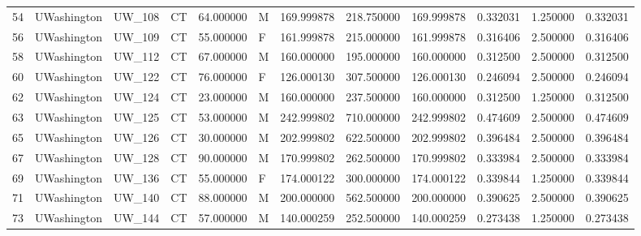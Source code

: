 \begin{tabular}{llllrlrrrrrr}
54     &     UWashington &       UW\_108 &                 CT &  64.000000 &        M &       169.999878 &    218.750000 &  169.999878 &               0.332031 &            1.250000 &          0.332031 \\
56     &     UWashington &       UW\_109 &                 CT &  55.000000 &        F &       161.999878 &    215.000000 &  161.999878 &               0.316406 &            2.500000 &          0.316406 \\
58     &     UWashington &       UW\_112 &                 CT &  67.000000 &        M &       160.000000 &    195.000000 &  160.000000 &               0.312500 &            2.500000 &          0.312500 \\
60     &     UWashington &       UW\_122 &                 CT &  76.000000 &        F &       126.000130 &    307.500000 &  126.000130 &               0.246094 &            2.500000 &          0.246094 \\
62     &     UWashington &       UW\_124 &                 CT &  23.000000 &        M &       160.000000 &    237.500000 &  160.000000 &               0.312500 &            1.250000 &          0.312500 \\
63     &     UWashington &       UW\_125 &                 CT &  53.000000 &        M &       242.999802 &    710.000000 &  242.999802 &               0.474609 &            2.500000 &          0.474609 \\
65     &     UWashington &       UW\_126 &                 CT &  30.000000 &        M &       202.999802 &    622.500000 &  202.999802 &               0.396484 &            2.500000 &          0.396484 \\
67     &     UWashington &       UW\_128 &                 CT &  90.000000 &        M &       170.999802 &    262.500000 &  170.999802 &               0.333984 &            2.500000 &          0.333984 \\
69     &     UWashington &       UW\_136 &                 CT &  55.000000 &        F &       174.000122 &    300.000000 &  174.000122 &               0.339844 &            1.250000 &          0.339844 \\
71     &     UWashington &       UW\_140 &                 CT &  88.000000 &        M &       200.000000 &    562.500000 &  200.000000 &               0.390625 &            2.500000 &          0.390625 \\
73     &     UWashington &       UW\_144 &                 CT &  57.000000 &        M &       140.000259 &    252.500000 &  140.000259 &               0.273438 &            1.250000 &          0.273438 \\

\end{tabular}
